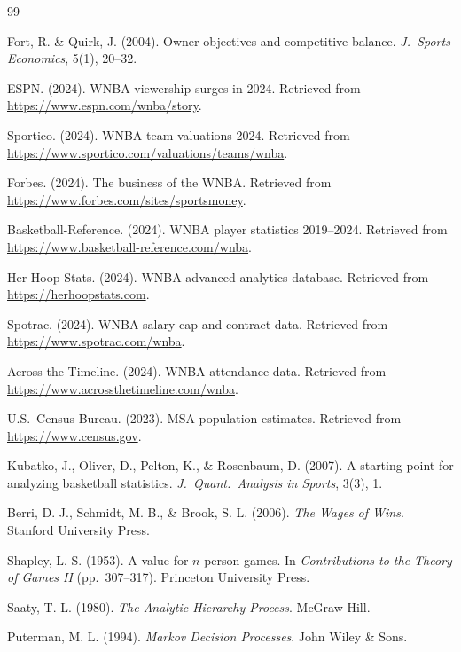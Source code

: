 \documentclass{mcmthesis}
\begin{document}
\begin{thebibliography}{99}

 Fort, R. \& Quirk, J. (2004). Owner objectives and competitive balance. \textit{J.\ Sports Economics}, 5(1), 20--32.

 ESPN. (2024). WNBA viewership surges in 2024. Retrieved from \url{https://www.espn.com/wnba/story}.

 Sportico. (2024). WNBA team valuations 2024. Retrieved from \url{https://www.sportico.com/valuations/teams/wnba}.

 Forbes. (2024). The business of the WNBA. Retrieved from \url{https://www.forbes.com/sites/sportsmoney}.

 Basketball-Reference. (2024). WNBA player statistics 2019--2024. Retrieved from \url{https://www.basketball-reference.com/wnba}.

 Her Hoop Stats. (2024). WNBA advanced analytics database. Retrieved from \url{https://herhoopstats.com}.

 Spotrac. (2024). WNBA salary cap and contract data. Retrieved from \url{https://www.spotrac.com/wnba}.

 Across the Timeline. (2024). WNBA attendance data. Retrieved from \url{https://www.acrossthetimeline.com/wnba}.

 U.S.\ Census Bureau. (2023). MSA population estimates. Retrieved from \url{https://www.census.gov}.

 Kubatko, J., Oliver, D., Pelton, K., \& Rosenbaum, D. (2007). A starting point for analyzing basketball statistics. \textit{J.\ Quant.\ Analysis in Sports}, 3(3), 1.

 Berri, D. J., Schmidt, M. B., \& Brook, S. L. (2006). \textit{The Wages of Wins}. Stanford University Press.

 Shapley, L. S. (1953). A value for $n$-person games. In \textit{Contributions to the Theory of Games II} (pp.\ 307--317). Princeton University Press.

 Saaty, T. L. (1980). \textit{The Analytic Hierarchy Process}. McGraw-Hill.

 Puterman, M. L. (1994). \textit{Markov Decision Processes}. John Wiley \& Sons.


\end{thebibliography}
\end{document}
